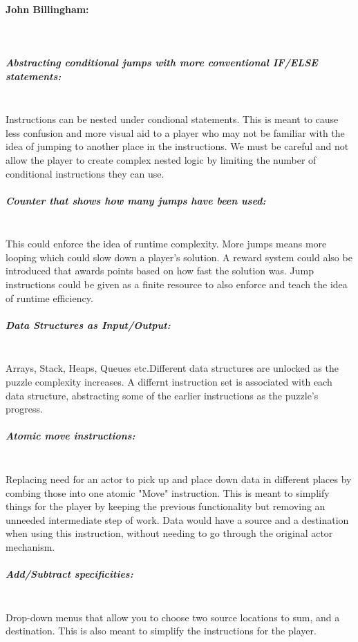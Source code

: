 \paragraph{John Billingham:}\mbox{} \\
\subparagraph{Abstracting conditional jumps with more conventional IF/ELSE statements:}\mbox{} \\
Instructions can be nested under condional statements. This is meant to
cause less confusion and more visual aid to a player who may not be familiar
with the idea of jumping to another place in the instructions. We must be careful
and not allow the player to create complex nested logic by limiting the number
of conditional instructions they can use.\\

\subparagraph{Counter that shows how many jumps have been used:}\mbox{} \\
This could enforce the idea of runtime complexity. More jumps means more
looping which could slow down a player's solution. A reward system could also
be introduced that awards points based on how fast the solution was. Jump
instructions could be given as a finite resource to also enforce and teach the
idea of runtime efficiency.\\

\subparagraph{Data Structures as Input/Output:}\mbox{} \\
Arrays, Stack, Heaps, Queues etc.Different data structures are unlocked as the puzzle complexity increases.
A differnt instruction set is associated with each data structure, abstracting
some of the earlier instructions as the puzzle's progress.\\

\subparagraph{Atomic move instructions:}\mbox{} \\
Replacing need for an actor to pick up and place down data  in different places by combing those into
one atomic "Move" instruction. This is meant to simplify things for the player by keeping
the previous functionality but removing an unneeded intermediate step of work. Data would have
a source and a destination when using this instruction, without needing to go through
the original actor mechanism.\\

\subparagraph{Add/Subtract specificities:}\mbox{} \\
Drop-down menus that allow you to choose two source locations to sum, and
a destination. This is also meant to simplify the instructions for the player.\\

